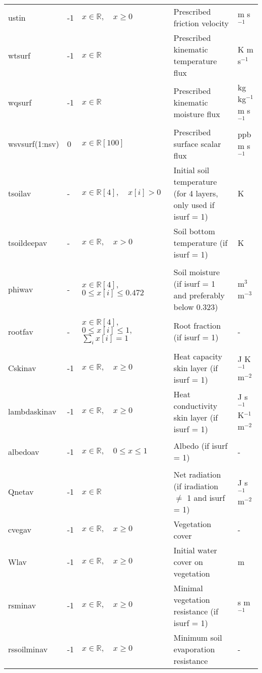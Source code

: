 \documentclass[twoside,11pt,fleqn,a4paper,english,openright]{report}
\begin{document}
\begin{center}
\begin{supertabular}{|l|p{1.6cm}|p{3.5cm}|p{6cm}|l|}
  ustin	& -1	& $x \in \mathbb{R}, \quad x \ge 0$	& Prescribed friction velocity & m s$^{-1}$\\
  wtsurf	& -1	& $x \in \mathbb{R}$	& Prescribed kinematic temperature flux	& K m s$^{-1}$\\
  wqsurf	& -1	& $x \in \mathbb{R}$	& Prescribed kinematic moisture flux & kg kg$^{-1}$ m s$^{-1}$\\
  wsvsurf(1:nsv)& 0	& $x \in \mathbb{R}[100]$	& Prescribed surface scalar flux & ppb m s$^{-1}$\\ 
  tsoilav	& -	& $x \in \mathbb{R}[4], \quad x[i] > 0$	& Initial soil temperature (for 4 layers, only used if isurf = 1)	& K\\
  tsoildeepav	& - & $x \in \mathbb{R}, \quad x>0$ & Soil bottom temperature (if isurf = 1)& K \\
  &&&&\\
  phiwav	& -	& \parbox{3.5cm}{$x \in \mathbb{R}[4],$\\$0 \leq x[i] \leq 0.472$}	& \parbox{6cm}{Soil moisture (if isurf = 1 and preferably below 0.323)}	& m$^{3}$ m$^{-3}$\\
  &&&&\\
  rootfav	& -	& \parbox{3.5cm}{$x \in \mathbb{R}[4],$\\$ 0 \leq x[i] \leq 1, $\\$ \sum_i x[i] =1$}	& Root fraction	(if isurf = 1) & -	\\
  &&&&\\
  Cskinav	& -1	& $x \in \mathbb{R}, \quad x \ge 0$	& Heat capacity skin layer (if isurf = 1)	& J K$^{-1}$ m$^{-2}$\\
  lambdaskinav	&-1	& $x \in \mathbb{R}, \quad x \ge 0$	& Heat conductivity skin layer (if isurf = 1)	& J s$^{-1}$ K$^{-1}$ m$^{-2}$\\
  \hypertarget{albedo}{albedoav}	& -1	& $x \in \mathbb{R}, \quad 0 \le x \le 1$ & Albedo (if isurf = 1)	& -\\
  Qnetav	& -1	& $x \in \mathbb{R}$	& Net radiation (if iradiation $\ne$ 1 and isurf = 1)	& J s$^{-1}$ m$^{-2}$\\
  cvegav	& -1	& $x \in \mathbb{R}, \quad x \ge 0$	& Vegetation cover & -\\
  Wlav		& -1	& $x \in \mathbb{R}, \quad x \ge 0$	& Initial water cover on vegetation	& m\\
  rsminav	& -1	& $x \in \mathbb{R}, \quad x \ge 0$	& Minimal vegetation resistance	(if isurf = 1)& s m$^{-1}$\\
  rssoilminav & -1	&  $x \in \mathbb{R}, \quad x \ge 0$ & Minimum soil evaporation resistance &-\\

\end{supertabular}
\end{center}
\end{document}
